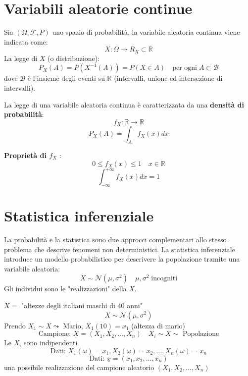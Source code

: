 \documentclass[a4paper]{article}
\theoremstyle{break}
\theoremstyle{break}
\theoremstyle{break}
\theoremstyle{break}
\begin{document}
\section{Variabili aleatorie continue}
Sia \( (\Omega, \mathcal{F}, P) \) uno spazio di probabilità, la variabile aleatoria
continua viene indicata come:
\[
X: \Omega \to R_X \subset \mathbb{R}
\] 
La legge di \( X \) (o distribuzione):
\[
  P_X(A) = P(X^{-1}(A)) = P(X \in A) \quad \text{per ogni} \; A \subset \mathcal{B}
\] 
dove \( \mathcal{B} \) è l'insieme degli eventi su \( \mathbb{R} \) (intervalli, unione
ed intersezione di intervalli).

\vspace{1em}
\noindent La legge di una variabile aleatoria continua è caratterizzata da una
\textbf{densità di probabilità}:
\[
f_X: \mathbb{R} \to \mathbb{R}
\] 
\[
P_X(A) = \int_A f_X(x)dx
\] 

\textbf{Proprietà di \( f_X \) }:
\[
0 \le f_X(x) \le 1 \quad x \in \mathbb{R}
\] 
\[
\int_{-\infty}^{+\infty} f_X(x)dx = 1
\] 

\section{Statistica inferenziale}
La probabilità e la statistica sono due approcci complementari allo stesso problema che
descrive fenomeni non deterministici. La statistica inferenziale introduce un modello
probabilistico per descrivere la popolazione tramite una variabile aleatoria:
\[
X \sim \mathcal{N}(\mu, \sigma^2) \quad \mu, \sigma^2 \; \text{incogniti}
\] 
Gli individui sono le "realizzazioni" della \( X \).

\begin{example}
  \( X =\) "altezze degli italiani maschi di 40 anni"
  \[
  X \sim \mathcal{N}(\mu, \sigma^2)
  \] 
  Prendo \( X_1 \sim X \leadsto\) Mario, \( X_1(10) = x_1 \) (altezza di mario)
  \[
    \text{Campione: } \underline{X} = (X_1, X_2, \ldots, X_n) \quad X_i \sim X \sim \text{ Popolazione}
  \] 
  Le \( X_i \) sono indipendenti
  \[
  \text{Dati: } X_1(\omega) = x_1, X_2(\omega) = x_2, \ldots, X_n(\omega) = x_n
  \] 
  \[
    \text{Dati: } \underline{x} = (x_1, x_2, \ldots, x_n)
  \] 
  una possibile realizzazione del campione aleatorio \( (X_1, X_2, \ldots, X_n) \)
\end{example}
\end{document}
